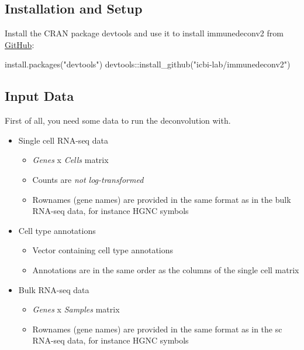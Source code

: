 \documentclass[
]{article}
\newenvironment{Shaded}{\begin{snugshade}}{\end{snugshade}}
\newcommand{\FunctionTok}[1]{\textcolor[rgb]{0.00,0.00,0.00}{#1}}
\newcommand{\NormalTok}[1]{#1}
\newcommand{\SpecialCharTok}[1]{\textcolor[rgb]{0.00,0.00,0.00}{#1}}
\newcommand{\StringTok}[1]{\textcolor[rgb]{0.31,0.60,0.02}{#1}}
\providecommand{\tightlist}{%
  \setlength{\itemsep}{0pt}\setlength{\parskip}{0pt}}
\begin{document}
\hypertarget{installation-and-setup}{%
\subsection{Installation and Setup}\label{installation-and-setup}}

Install the CRAN package devtools and use it to install immunedeconv2
from \href{https://github.com/}{GitHub}:

\begin{Shaded}
\begin{Highlighting}[]
\FunctionTok{install.packages}\NormalTok{(}\StringTok{"devtools"}\NormalTok{)}
\NormalTok{devtools}\SpecialCharTok{::}\FunctionTok{install\_github}\NormalTok{(}\StringTok{"icbi{-}lab/immunedeconv2"}\NormalTok{)}
\end{Highlighting}
\end{Shaded}

\hypertarget{input-data}{%
\subsection{Input Data}\label{input-data}}

First of all, you need some data to run the deconvolution with.

\begin{itemize}
\tightlist
\item
  Single cell RNA-seq data

  \begin{itemize}
  \tightlist
  \item
    \emph{Genes} x \emph{Cells} matrix
  \item
    Counts are \emph{not log-transformed}
  \item
    Rownames (gene names) are provided in the same format as in the bulk
    RNA-seq data, for instance HGNC symbols
  \end{itemize}
\item
  Cell type annotations

  \begin{itemize}
  \tightlist
  \item
    Vector containing cell type annotations
  \item
    Annotations are in the same order as the columns of the single cell
    matrix
  \end{itemize}
\item
  Bulk RNA-seq data

  \begin{itemize}
  \tightlist
  \item
    \emph{Genes} x \emph{Samples} matrix
  \item
    Rownames (gene names) are provided in the same format as in the sc
    RNA-seq data, for instance HGNC symbols
  \end{itemize}
\end{itemize}
\end{document}
